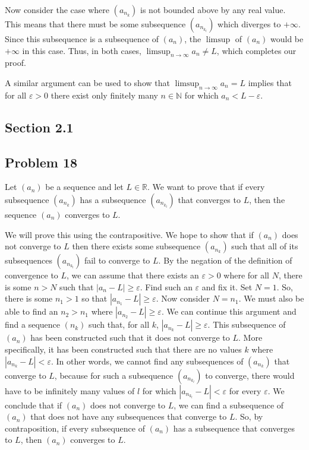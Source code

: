 \documentclass[11pt]{article}
\newcommand{\N}{\mathbb{N}}
\newcommand{\R}{\mathbb{R}}
\begin{document}
Now consider the case where $(a_{n_k})$ is not bounded above by any real value.
This means that there must be some subsequence $(a_{n_{k_l}})$ which diverges
to $+\infty$. Since this subsequence is a subsequence of $(a_n)$, the $\limsup$
of $(a_n)$ would be $+\infty$ in this case. Thus, in both cases, 
$\limsup_{n\to\infty}a_n\neq L$, which completes our proof.

A similar argument can be used to show that
$\limsup_{n\to\infty}a_n=L$ implies that for all $\varepsilon>0$ there
exist only finitely many $n\in\N$ for which $a_n<L-\varepsilon$.

\subsection*{Section 2.1}
\subsection*{Problem 18}

Let $(a_n)$ be a sequence and let $L\in\R$. We want to prove that if every
subsequence $(a_{n_k})$ has a subsequence $(a_{n_{k_l}})$ that converges to
$L$, then the sequence $(a_n)$ converges to $L$. 

We will prove this using the contrapositive. We hope to show that if $(a_n)$ does
not converge to $L$ then there exists some subsequence $(a_{n_k})$ such that
all of its subsequences $(a_{n_{k_l}})$ fail to converge to $L$.
By the negation of the definition of convergence to $L$, we can assume that
there exists an $\varepsilon>0$ where for all $N$, there is some $n>N$ such
that $\left|a_n-L\right| \geq \varepsilon$. Find such an $\varepsilon$ and
fix it. Set $N=1$. So, there is some $n_1>1$ so that
$\left|a_{n_1}-L\right|\geq\varepsilon.$ Now consider $N=n_1$. We must also
be able to find an $n_2>n_1$ where $\left|a_{n_2}-L\right|\geq\varepsilon$.
We can continue this argument and find a sequence $(n_k)$ such that,
for all $k$, $\left|a_{n_k}-L\right|\geq\varepsilon$. This subsequence of
$(a_n)$ has been constructed such that it does not converge to $L$. More
specifically, it has been constructed such that there are no values $k$ where
$\left|a_{n_k}-L\right|<\varepsilon$. In other words, we cannot find any
subsequences of $(a_{n_k})$ that converge to $L$, because for such a
subsequence $(a_{n_{k_l}})$ to converge, there would have to be 
infinitely many values of $l$ for which
$\left|a_{n_{k_l}}-L\right|<\varepsilon$ for every $\varepsilon$.
We conclude that if $(a_n)$ does not converge to $L$, we can find a subsequence
of $(a_n)$ that does not have any subsequences that converge to $L$. So, by
contraposition, if every subsequence of $(a_n)$ has a subsequence that
converges to $L$, then $(a_n)$ converges to $L$.
\end{document}
